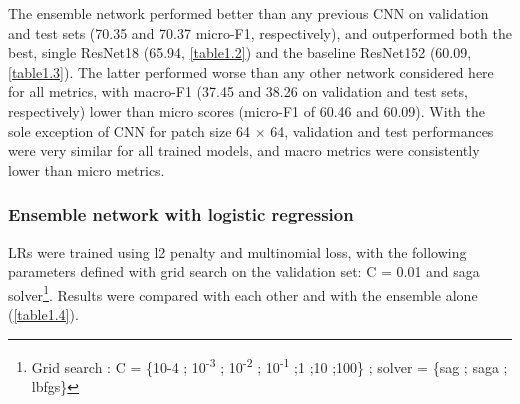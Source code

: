 The ensemble network performed better than any previous CNN on validation and test sets (70.35 and 70.37 micro-F1, respectively), and outperformed both the best, single ResNet18 (65.94, \autoref{table1.2}) and the baseline ResNet152 (60.09, \autoref{table1.3}). The latter performed worse than any other network considered here for all metrics, with macro-F1 (37.45 and 38.26 on validation and test sets, respectively) lower than micro scores (micro-F1 of 60.46 and 60.09). With the sole exception of CNN for patch size 64 \(\times\) 64, validation and test performances were very similar for all trained models, and macro metrics were consistently lower than micro metrics.

\subsubsection{Ensemble network with logistic regression}\label{chapitre1_6.2.2}
LRs were trained using l2 penalty and multinomial loss, with the following parameters defined with grid search on the validation set: C = 0.01 and saga solver\footnote{Grid search : C = \{10-4 ; 10\textsuperscript{-3} ; 10\textsuperscript{-2} ; 10\textsuperscript{-1} ;1 ;10 ;100\} ; solver = \{sag ; saga ; lbfgs\}}. Results were compared with each other and with the ensemble alone (\autoref{table1.4}).

